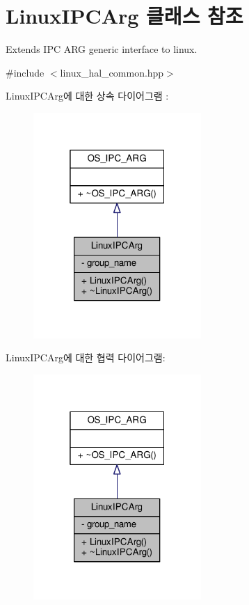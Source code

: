 \hypertarget{class_linux_i_p_c_arg}{}\section{Linux\+I\+P\+C\+Arg 클래스 참조}
\label{class_linux_i_p_c_arg}


Extends I\+PC A\+RG generic interface to linux.  




{\ttfamily \#include $<$linux\+\_\+hal\+\_\+common.\+hpp$>$}



Linux\+I\+P\+C\+Arg에 대한 상속 다이어그램 \+: 
\nopagebreak
\begin{figure}[H]
\begin{center}
\leavevmode
\includegraphics[width=181pt]{class_linux_i_p_c_arg__inherit__graph}
\end{center}
\end{figure}


Linux\+I\+P\+C\+Arg에 대한 협력 다이어그램\+:
\nopagebreak
\begin{figure}[H]
\begin{center}
\leavevmode
\includegraphics[width=181pt]{class_linux_i_p_c_arg__coll__graph}
\end{center}
\end{figure}
